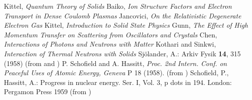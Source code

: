 \documentclass{article}
\begin{document}
\begin{thebibliography}{1}
   Kittel, \emph{Quantum Theory of Solids}
   Baiko, \emph{Ion Structure Factors and Electron Transport in Dense Coulomb Plasmas}
   Jancovici, \emph{On the Relativistic Degenerate Electron Gas}
   Kittel, \emph{Introduction to Solid State Physics}
   Gunn, \emph{The Effect of High Momentum Transfer on Scattering from Oscillators and Crystals}
   Chen, \emph{Interactions of Photons and Neutrons with Matter}
   Kothari and Sinkwi, \emph{Interaction of Thermal Neutrons with Solids}
   Sj\"{o}lander, A.: Arkiv Fysik \textbf{14}, 315 (1958) (from \cite{impulse} and \cite{multiphonon})
   P. Schofield and A. Hassitt, \emph{Proc. 2nd Intern. Conf. on Peaceful Uses of Atomic Energy, Geneva} P 18 (1958). (from \cite{multiphonon})
   Schofield, P., Hassitt, A.: Progress in nuclear energy. Ser. I, Vol. 3, p dots in 194. London: Pergamon Press 1959 (from \cite{impulse})


\end{thebibliography}
\end{document}
